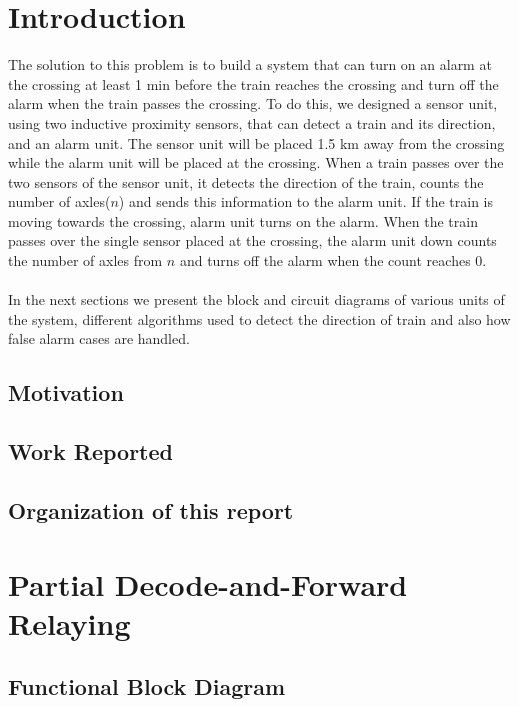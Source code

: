 \documentclass[titlepage]{article}
\begin{document}
\tableofcontents
\newpage





\section{Introduction}
The solution to this problem is to build a system that can turn on an alarm at the crossing at least 1 min
before the train reaches the crossing and turn off the alarm when the train passes the crossing. To do this, we
designed a sensor unit, using two inductive proximity sensors, that can detect a train and its direction,
and an alarm unit. The sensor unit will be placed 1.5 km away from the crossing while the alarm unit will be
placed at the crossing. When a train passes over the two sensors of the sensor unit, it detects the direction
of the train, counts the number of axles\footnotemark{}($n$) and sends this information to the alarm unit. If the train is moving
towards the crossing, alarm unit turns on the alarm. When the train passes over the single sensor placed at the crossing,
the alarm unit down counts the number of axles from $n$ and turns off the alarm when the count reaches 0.
\\ \\
In the next sections we present the block and circuit diagrams of various units of the system, different
algorithms used to detect the direction of train and also how false alarm cases are handled.
\subsection{Motivation}
\subsection{Work Reported}
\subsection{Organization of this report}

\section{Partial Decode-and-Forward Relaying}
\subsection{Functional Block Diagram}
\end{document}
